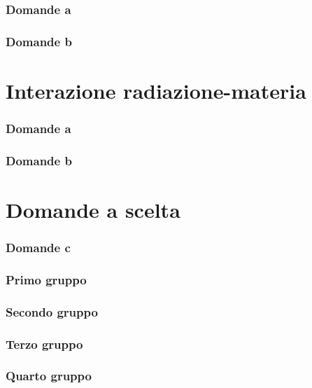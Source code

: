\documentclass[10pt,a4paper]{article}
\begin{document}
\section{Domande a}
\section{Domande b}


\part{Interazione radiazione-materia}
\setcounter{section}{0}
\renewcommand*{\theHsection}{chX.\the\value{section}}
\section{Domande a}
\section{Domande b}

\part{Domande a scelta}

\section{Domande c}%

\section*{Primo gruppo}%
\setcounter{subsection}{0}
 


\section*{Secondo gruppo}%
\setcounter{subsection}{1}
 

\section*{Terzo gruppo}%
\setcounter{subsection}{2}
 


\section*{Quarto gruppo}%
\setcounter{subsection}{3}
 
\end{document}
